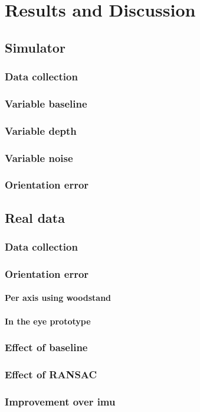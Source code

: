 
\chapter{Results and Discussion}
\label{cha4:results}

\section{Simulator}
\subsection{Data collection}
\subsection{Variable baseline}
\subsection{Variable depth}
\subsection{Variable noise}
\subsection{Orientation error}

\section{Real data}
\subsection{Data collection}
\subsection{Orientation error}
\subsubsection{Per axis using woodstand}
\subsubsection{In the eye prototype}
\subsection{Effect of baseline}
\subsection{Effect of RANSAC}
\subsection{Improvement over \acrlong{imu}}